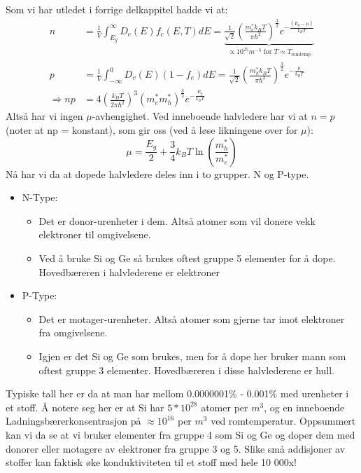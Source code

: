 \documentclass{article}
\begin{document}



Som vi har utledet i forrige delkappitel hadde vi at:
\begin{align*}
  n &= \frac{1}{V} \int_{E_g}^{\infty} D_c(E) f_c(E, T)dE = \underbrace{\frac{1}{\sqrt{2}} \left( \frac{m_e^{*} k_B T}{\pi \hbar^2}\right)^{\frac{3}{2}} e^{-\frac{(E_g - \mu)}{k_B T}} }_{\propto 10^{25} m^{-3}\text{ for } T \approx T_{\text{romtemp}}} \\
  p &=\frac{1}{V} \int_{-\infty}^0 D_v(E) (1-f_e) dE = \frac{1}{\sqrt{2}} \left( \frac{m_h^{*} k_B T}{\pi \hbar^2}\right)^{\frac{3}{2}} e^{-\frac{\mu}{k_B T}}\\
  \Rightarrow np &= 4 \left(\frac{k_B T}{2 \pi \hbar^2}\right)^3 (m_e^{*} m_h^{*})^{\frac{3}{2}} e^{-\frac{E_g}{k_B T}}
\end{align*}
Altså har vi ingen $\mu$-avhengighet. Ved inneboende halvledere har vi at $n=p$ (noter at np = konstant), som gir oss (ved å løse likningene over for $\mu$):
\begin{equation*}
  \mu = \frac{E_g}{2} + \frac{3}{4} k_B T \ln{\left(\frac{m_h^{*}}{m_e^{*}}  \right)}
\end{equation*}
Nå har vi da at dopede halvledere deles inn i to grupper. N og P-type.
\begin{itemize}
  \item N-Type:
  \begin{itemize}
    \item Det er donor-urenheter i dem. Altså atomer som vil donere vekk elektroner til omgivelsene.
    \item Ved å bruke Si og Ge så brukes oftest gruppe 5 elementer for å dope. Hovedbæreren i halvlederene er elektroner
  \end{itemize}
  \item P-Type: 
  \begin{itemize}
    \item Det er motager-urenheter. Altså atomer som gjerne tar imot elektroner fra omgivelsene.
    \item Igjen er det Si og Ge som brukes, men for å dope her bruker mann som oftest gruppe 3 elementer. Hovedbæreren i disse halvlederene er hull.
  \end{itemize}
\end{itemize}
Typiske tall her er da at man har mellom  0.0000001\% - 0.001\% med urenheter i et stoff. Å notere seg her er at Si har $5 * 10^{28}$ atomer per $m^3$, og en inneboende Ladningsbærerkonsentrasjon på $\approx 10^{16}$ per $m^3$ ved romtemperatur. Oppsummert kan vi da se at vi bruker elementer fra gruppe 4 som Si og Ge og doper dem med donorer eller motagere av elektroner fra gruppe 3 og 5. Slike små addisjoner av stoffer kan faktisk øke konduktiviteten til et stoff med hele 10 000x!
\end{document}
